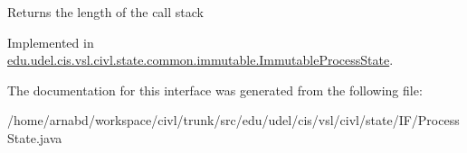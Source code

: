 \begin{DoxyReturn}{Returns}
the length of the call stack 
\end{DoxyReturn}


Implemented in \hyperlink{classedu_1_1udel_1_1cis_1_1vsl_1_1civl_1_1state_1_1common_1_1immutable_1_1ImmutableProcessState_a802ad0474e539455212ddf903a8fc4e1}{edu.\+udel.\+cis.\+vsl.\+civl.\+state.\+common.\+immutable.\+Immutable\+Process\+State}.



The documentation for this interface was generated from the following file\+:\begin{DoxyCompactItemize}
\item 
/home/arnabd/workspace/civl/trunk/src/edu/udel/cis/vsl/civl/state/\+I\+F/Process\+State.\+java\end{DoxyCompactItemize}
